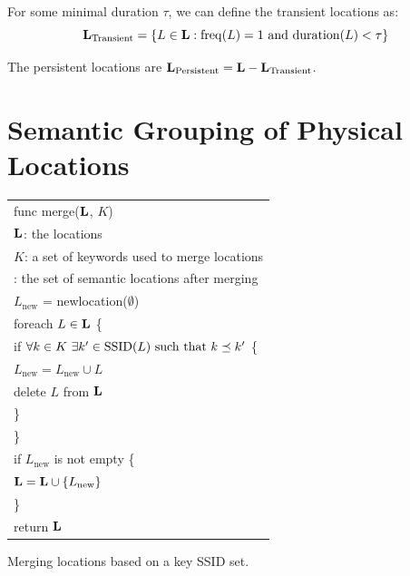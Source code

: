 For some minimal duration $\tau$, we can define the transient locations as:
$$\mathbf{L}_\mathrm{Transient} = \{ L\in \mathbf{L} :
    \mathrm{freq}(L) = 1\ \mathrm{and}\ \mathrm{duration}(L) < \tau
\}$$

The persistent locations are $\mathbf{L}_\mathrm{Persistent} = \mathbf{L} -
\mathbf{L}_\mathrm{Transient}$.

\section{Semantic Grouping of Physical Locations}

\begin{algorithm}[t]
    \centering
    \begin{tabular}{|l|} \hline
        func merge($\mathbf{L}$, $K$) \\
        \RRR $\mathbf{L}$: the locations \\
        \RRR $K$: a set of keywords used to merge locations \\
        \RRR {\em returns}: the set of semantic locations after merging\\ \hline
        $L_\mathrm{new}$ = newlocation($\emptyset$)\\
        foreach $L\in\mathbf{L}$ \{ \\
            \RRR if $\forall k\in K\ \exists k'\in\mathrm{SSID}(L)\ \mathrm{such\ that}\ k\preceq k'$ \{ \\
            \RRR \RRR $L_\mathrm{new} = L_\mathrm{new}\cup L$ \\
            \RRR \RRR delete $L$ from $\mathbf{L}$ \\
            \RRR \} \\
        \} \\
        if $L_\mathrm{new}$ is not empty \{ \\
        \RRR $\mathbf{L} = \mathbf{L}\cup\{L_\mathrm{new}\}$ \\
        \} \\
        return $\mathbf{L}$ \\ \hline
    \end{tabular}
    \vspace{0.4cm}
    \caption{Merging locations based on a key SSID set.}
    \label{alg:merge}
\end{algorithm}

